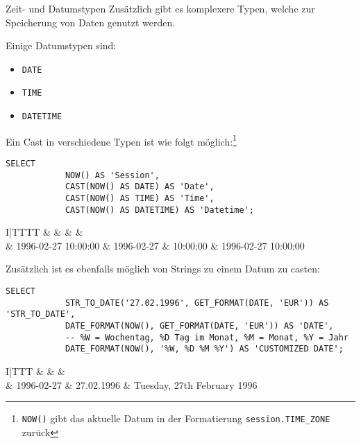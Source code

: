 \begin{sql}{Zeit- und Datumstypen}
    Zusätzlich gibt es komplexere Typen, welche zur Speicherung von Daten genutzt werden.

    Einige Datumstypen sind:

    \begin{itemize}
        \item \texttt{DATE}
        \item \texttt{TIME}
        \item \texttt{DATETIME}
    \end{itemize}

    Ein Cast in verschiedene Typen ist wie folgt möglich:\footnote{\texttt{NOW()} gibt das aktuelle Datum in der Formatierung \texttt{session.TIME\_ZONE} zurück}

    \begin{lstlisting}[language=mysql]
        SELECT
            NOW() AS 'Session',
            CAST(NOW() AS DATE) AS 'Date',
            CAST(NOW() AS TIME) AS 'Time',
            CAST(NOW() AS DATETIME) AS 'Datetime';
    \end{lstlisting}

    \setcounter{rownum}{0}
    \begin{tabular}{I|TTTT}
          &  &  &  &  \\ & 1996-02-27 10:00:00         & 1996-02-27               & 10:00:00                 & 1996-02-27 10:00:00          \\
    \end{tabular}
    \vspace{1em}

    Zusätzlich ist es ebenfalls möglich von Strings zu einem Datum zu casten:

    \begin{lstlisting}[language=mysql]
        SELECT
            STR_TO_DATE('27.02.1996', GET_FORMAT(DATE, 'EUR')) AS 'STR_TO_DATE',
            DATE_FORMAT(NOW(), GET_FORMAT(DATE, 'EUR')) AS 'DATE',
            -- %W = Wochentag, %D Tag im Monat, %M = Monat, %Y = Jahr
            DATE_FORMAT(NOW(), '%W, %D %M %Y') AS 'CUSTOMIZED DATE';
    \end{lstlisting}

    \setcounter{rownum}{0}
    \begin{tabular}{I|TTT}
          &  &  &  \\ & 1996-02-27                        & 27.02.1996               & Tuesday, 27th February 1996          \\
    \end{tabular}
    \vspace{1em}


\end{sql}
